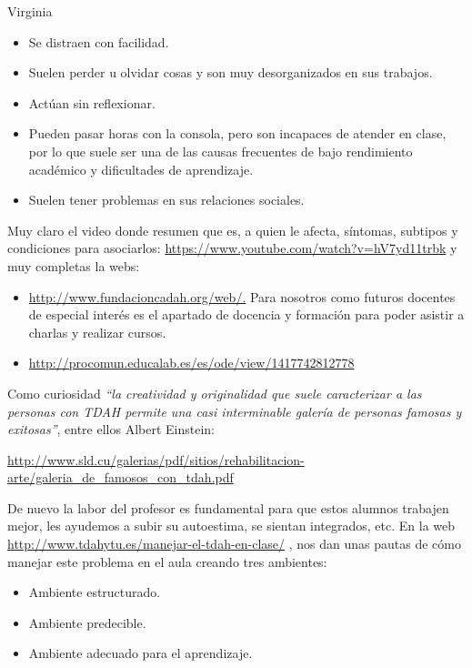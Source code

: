 \begin{opin}{\virgicolor}{Virginia}
\begin{itemize}
\item Se distraen con facilidad.

\item Suelen perder u olvidar cosas y son muy desorganizados en sus trabajos.

\item Actúan sin reflexionar.

\item Pueden pasar horas con la consola, pero son incapaces de atender en clase, por lo que suele ser una de las causas frecuentes de bajo rendimiento académico y dificultades de aprendizaje.

\item Suelen tener problemas en sus relaciones sociales.
\end{itemize}
Muy claro el video donde resumen que es, a quien le afecta, síntomas, subtipos y condiciones para asociarlos: \url{https://www.youtube.com/watch?v=hV7yd11trbk} y muy completas la webs: 

\begin{itemize}
\item \url{http://www.fundacioncadah.org/web/.} Para nosotros como futuros docentes de especial interés es el apartado de docencia y formación para poder asistir a charlas y realizar cursos.

\item \url{http://procomun.educalab.es/es/ode/view/1417742812778} 
\end{itemize}

Como curiosidad \textit{“la creatividad y originalidad que suele caracterizar a las personas con TDAH permite una casi interminable galería de personas famosas y exitosas”}, entre ellos Albert Einstein:  

\url{http://www.sld.cu/galerias/pdf/sitios/rehabilitacion-arte/galeria_de_famosos_con_tdah.pdf}

De nuevo la labor del profesor es fundamental para que estos alumnos trabajen mejor, les ayudemos a subir su autoestima, se sientan integrados, etc. En la web \url{http://www.tdahytu.es/manejar-el-tdah-en-clase/} , nos dan unas pautas de cómo manejar este problema en el aula creando tres ambientes:

\begin{itemize}
\item Ambiente estructurado.

\item Ambiente predecible.

\item Ambiente adecuado para el aprendizaje.
\end{itemize}

\end{opin}
